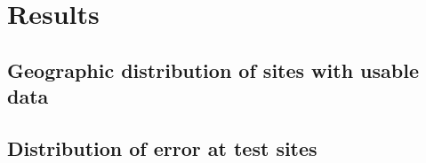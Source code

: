 \chapter{Results}
\section{Geographic distribution of sites with usable data}
\section{Distribution of error at test sites}